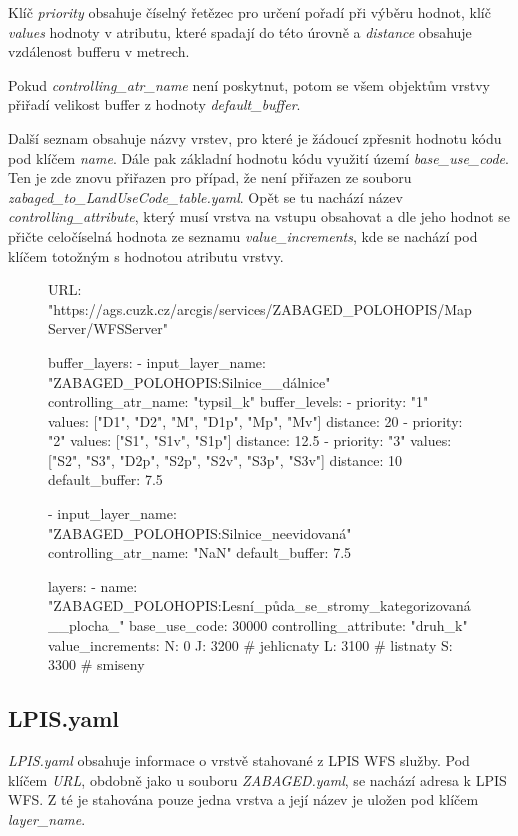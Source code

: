 \documentclass[a4paper,oneside,12pt]{book}
\begin{document}
\hspace{10mm}Klíč \textit{priority} obsahuje číselný řetězec pro určení pořadí při výběru hodnot, klíč \textit{values} hodnoty v atributu, které spadají do této úrovně a \textit{distance} obsahuje vzdálenost bufferu v metrech.

\hspace{10mm}Pokud \textit{controlling\_atr\_name} není poskytnut, potom se všem objektům vrstvy přiřadí velikost buffer z hodnoty \textit{default\_buffer}.

\hspace{10mm}Další seznam obsahuje názvy vrstev, pro které je žádoucí zpřesnit hodnotu kódu pod klíčem \textit{name}. Dále pak základní hodnotu kódu využití území \textit{base\_use\_code}. Ten je zde znovu přiřazen pro případ, že není přiřazen ze souboru  \newline \textit{zabaged\_to\_LandUseCode\_table.yaml}. Opět se tu nachází název \textit{controlling\_attribute}, který musí vrstva na vstupu obsahovat a dle jeho hodnot se přičte celočíselná hodnota ze seznamu \textit{value\_increments}, kde se nachází pod klíčem totožným s hodnotou atributu vrstvy. 

\begin{figure}[H]
\begin{pythoncode}[style=myyaml, caption={Ukázka ZABAGED.yaml},label={kod:ZABAGED.yaml}]
URL: "https://ags.cuzk.cz/arcgis/services/ZABAGED_POLOHOPIS/MapServer/WFSServer"

buffer_layers:
  - input_layer_name: "ZABAGED_POLOHOPIS:Silnice__dálnice"
    controlling_atr_name: "typsil_k"
    buffer_levels:
      - priority: "1"
        values: ["D1", "D2", "M", "D1p", "Mp", "Mv"]
        distance: 20
      - priority: "2"
        values: ["S1", "S1v", "S1p"]
        distance: 12.5
      - priority: "3"
        values: ["S2", "S3", "D2p", "S2p", "S2v", "S3p", "S3v"]
        distance: 10
    default_buffer: 7.5

  - input_layer_name: "ZABAGED_POLOHOPIS:Silnice_neevidovaná"
    controlling_atr_name: "NaN"
    default_buffer: 7.5

layers:
  - name: "ZABAGED_POLOHOPIS:Lesní_půda_se_stromy_kategorizovaná__plocha_"
    base_use_code: 30000
    controlling_attribute: "druh_k"
    value_increments:
      N: 0
      J: 3200 # jehlicnaty
      L: 3100 # listnaty
      S: 3300 # smiseny
\end{pythoncode}
\end{figure}

\subsection*{LPIS.yaml} \label{LPIS.yaml}
\hspace{10mm} \textit{LPIS.yaml} obsahuje informace o vrstvě stahované z LPIS WFS služby. Pod klíčem \textit{URL}, obdobně jako u souboru \textit{ZABAGED.yaml}, se nachází adresa k LPIS WFS. Z té je stahována pouze jedna vrstva a její název je uložen pod klíčem \textit{layer\_name}.
\end{document}
